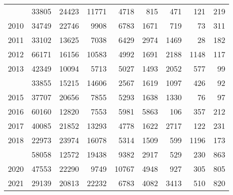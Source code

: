 \documentclass[
]{article}
\begin{document}
\begin{longtable}[t]{lrrrrrrrr}
\addlinespace
2009 & 33805 & 24423 & 11771 & 4718 & 815 & 471 & 121 & 219\\
2010 & 34749 & 22746 & 9908 & 6783 & 1671 & 719 & 73 & 311\\
2011 & 33102 & 13625 & 7038 & 6429 & 2974 & 1469 & 28 & 182\\
2012 & 66171 & 16156 & 10583 & 4992 & 1691 & 2188 & 1148 & 117\\
2013 & 42349 & 10094 & 5713 & 5027 & 1493 & 2052 & 577 & 99\\
\addlinespace
2014 & 33855 & 15215 & 14606 & 2567 & 1619 & 1097 & 426 & 92\\
2015 & 37707 & 20656 & 7855 & 5293 & 1638 & 1330 & 76 & 97\\
2016 & 60160 & 12820 & 7553 & 5981 & 5863 & 106 & 357 & 212\\
2017 & 40085 & 21852 & 13293 & 4778 & 1622 & 2717 & 122 & 231\\
2018 & 22973 & 23974 & 16078 & 5314 & 1509 & 599 & 1196 & 173\\
\addlinespace
2019 & 58058 & 12572 & 19438 & 9382 & 2917 & 529 & 230 & 863\\
2020 & 47553 & 22290 & 9749 & 10767 & 4948 & 927 & 305 & 805\\
2021 & 29139 & 20813 & 22232 & 6783 & 4082 & 3413 & 510 & 820\\*
\end{longtable}
\end{document}
